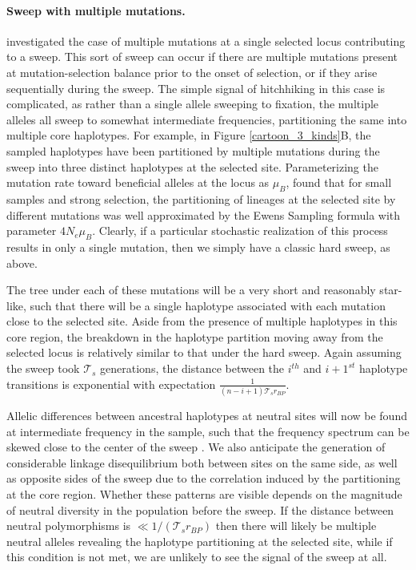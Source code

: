 \documentclass[a4paper,10pt]{article}
\newcommand{\gc}[1]{{\it \color{red} (#1)} }
\begin{document}
\paragraph{Sweep with multiple mutations.}
\citet{Pennings2006a, Pennings2006} investigated the case of multiple mutations at a single selected locus contributing to a sweep. This sort of sweep can occur if there are multiple mutations present at mutation-selection balance prior to the onset of selection, or if they arise sequentially during the sweep. The simple signal of hitchhiking in this case is complicated, as rather than a single allele sweeping to fixation, the multiple alleles all sweep to somewhat intermediate frequencies, partitioning the same into multiple core haplotypes. For example, in Figure \ref{cartoon_3_kinds}B, the sampled haplotypes have been partitioned by multiple mutations during the sweep into three distinct haplotypes at the selected site. Parameterizing the mutation rate toward beneficial alleles at the locus as $\mu_{B}$, \cite {Pennings2006a} found that for small samples and strong selection, the partitioning of lineages at the selected site by different mutations was well approximated by the Ewens Sampling formula with parameter $4N_e\mu_B$. Clearly, if a particular stochastic realization of this process results in only a single mutation, then we simply have a classic hard sweep, as above.

The tree under each of these mutations will be a very short and reasonably star-like, such that there will be a single haplotype associated with each mutation close to the selected site. Aside from the presence of multiple haplotypes in this core region, the breakdown in the haplotype partition moving away from the selected locus is relatively similar to that under the hard sweep. Again assuming the sweep took $\mathcal{T}_s$ generations, the distance between the $i^{th}$ and $i+1^{st}$ haplotype transitions is exponential with expectation $\frac{1}{\left(n-i+1\right)\mathcal{T}_s r_{BP}}$.

Allelic differences between ancestral haplotypes at neutral sites will now be found at intermediate frequency in the sample, such that the frequency spectrum can be skewed close to the center of the sweep \citep{Pennings2006}. 
We also anticipate the generation of considerable linkage disequilibrium both between sites on the same side, as well as opposite sides of the sweep due to the correlation induced by the partitioning at the core region\cite{Pokalyuk:2011kq}.  Whether these patterns are visible depends on the magnitude of neutral diversity in the population before the sweep. If the distance between neutral polymorphisms is $\ll 1/(\mathcal{T}_s r_{BP})$ then there will likely be multiple neutral alleles revealing the haplotype partitioning at the selected site, while if this condition is not met, we are unlikely to see the signal of the sweep at all.
\end{document}
